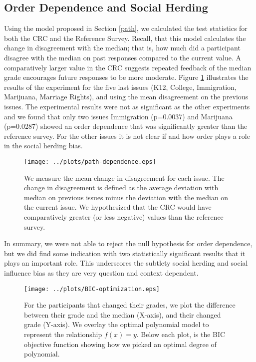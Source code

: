 \subsection{Order Dependence and Social Herding}
Using the model proposed in Section \ref{path}, we calculated the test statistics for both the CRC and the Reference Survey.
Recall, that this model calculates the change in disagreement with the median; that is, how much did a participant disagree with the median on past responses compared 
to the current value.
A comparatively larger value in the CRC suggests repeated feedback of the median grade encourages future responses to be more moderate.
Figure \ref{path-1} illustrates the results of the experiment for the five last issues (K12, College, Immigration, Marijuana, Marriage Rights), and using the mean disagreement on the previous issues.
The experimental results were not as significant as the other experiments and we found that only two issues Immigration (p=0.0037) and Marijuana (p=0.0287) showed an order dependence that was significantly greater than the reference survey.
For the other issues it is not clear if and how order plays a role in the social herding bias.
\begin{figure}[h]
	\hspace{-2em}
    \texttt{[image: ../plots/path-dependence.eps]}
      \caption{We measure the mean change in disagreement for each issue. The change in disagreement is defined as the average deviation with median on previous issues minus the deviation with the median on the current issue. We hypothesized that the CRC would have comparatively greater (or less negative) values than the reference survey.}
      \label{path-1}
\end{figure}
In summary, we were not able to reject the null hypothesis for order dependence, but we did find some indication with two statistically significant results that it plays an important role.
This underscores the subtlety social herding and social influence bias as they are very question and context dependent.

\begin{figure*}[ht!]
\hspace{-7em}
    \texttt{[image: ../plots/BIC-optimization.eps]}
      \caption{For the participants that changed their grades, we plot the difference between their grade and the median (X-axis), and their changed grade (Y-axis). We overlay the optimal polynomial model to represent the relationship $f(x) = y$. Below each plot, is the BIC objective function showing how we picked an optimal degree of polynomial.}
      \label{opt-1}
\end{figure*}
